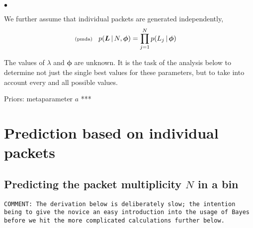 \documentclass[11pt]{article}
\newcommand{\lleq}[1]{\label{#1} }
\renewcommand{\lleq}[1]{\label{#1} {\scriptstyle {\rm (#1)}} \hspace*{2ex} }
\newenvironment{mtemize}{
  \begin{list}{$\bullet$}
    {\setlength{\itemsep}{0pt}
     \setlength{\leftmargin}{3ex}
    }
  }
  {\end{list}}
\newcommand{\cond}{\,|\,}
\newcommand{\bmL}{{\bm{L}}}
\newcommand{\bmphi}{{\bm{\phi}}}
\begin{document}
\begin{mtemize}
\item We further assume that individual packets are generated
  independently,
  \begin{align}
    \lleq{pmda}
    p(\bmL\cond N,\bmphi) &= \prod_{j=1}^N p(L_j\cond \bmphi)
  \end{align}

\item The values of $\lambda$ and $\bmphi$ are unknown. It is the task
  of the analysis below to determine not just the single best values
  for these parameters, but to take into account every and all
  possible values.

\item Priors: metaparameter $a$ ***

\end{mtemize}

\section{Prediction based on individual packets}


\subsection{Predicting the packet multiplicity $N$ in a bin}

\texttt{COMMENT: The derivation below is deliberately slow; the
  intention being to give the novice an easy introduction into the
  usage of Bayes before we hit the more complicated calculations
  further below.}
\end{document}
